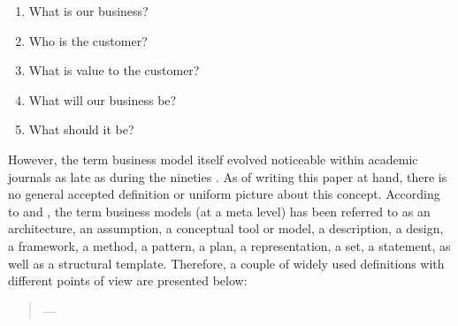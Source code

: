 \begin{enumerate}[parsep=0pt, topsep=0pt, itemsep=0pt]
	\item What is our business?
	\item Who is the customer?
	\item What is value to the customer?
	\item What will our business be?
	\item What should it be?
\end{enumerate}

However, the term business model itself evolved noticeable within academic journals as late as during the nineties . As of writing this paper at hand, there is no general accepted definition or uniform picture about this concept. According to \citet[p. 726]{Morris2005} and \citet[p. 1022]{Zott2011}, the term business models (at a meta level) has been referred to as an architecture, an assumption, a conceptual tool or model, a description, a design, a framework, a method, a pattern, a plan, a representation, a set, a statement, as well as a structural template. Therefore, a couple of widely used definitions with different points of view are presented below:
	
\begin{quotation}\vspace*{-5pt}{\slshape 
[A business model is] an architecture for the product, service and information flows, including a description of the various business actors and their roles; and a description of the potential benefits for the various business actors; and a description of the sources of revenues.}
\vspace*{-7pt}
\begin{flushright}
	--- \citealp[p. 2]{Timmers1998}
\end{flushright}
\end{quotation}


